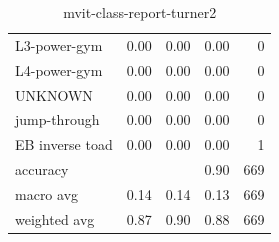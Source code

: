 \begin{table}[h!]
\begin{tabular}{|l|r|r|r|r|}
          L3-power-gym &       0.00 &     0.00 &     0.00 &        0 \\
          L4-power-gym &       0.00 &     0.00 &     0.00 &        0 \\
               UNKNOWN &       0.00 &     0.00 &     0.00 &        0 \\
          jump-through &       0.00 &     0.00 &     0.00 &        0 \\
       EB inverse toad &       0.00 &     0.00 &     0.00 &        1 \\ \hline
              accuracy &            &          &     0.90 &      669 \\
             macro avg &       0.14 &     0.14 &     0.13 &      669 \\
          weighted avg &       0.87 &     0.90 &     0.88 &      669 \\
         \hline
    \end{tabular}
    \caption[Turner 2 class report]{mvit-class-report-turner2}
    \label{tbl:mvit-class-report-turner2}
\end{table}

